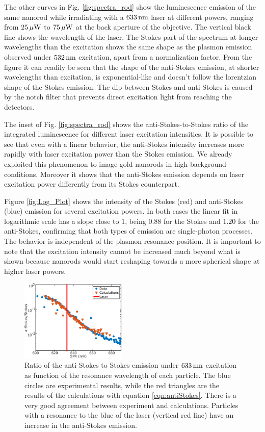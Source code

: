 The other curves in Fig. \ref{fig:spectra_rod} show the luminescence emission of
the same nanorod while irradiating with a $633\,\textrm{nm}$ laser at different powers,
ranging from $25\,\mu\textrm{W}$ to $75\,\mu\textrm{W}$ at the back aperture of the objective. The
vertical black line shows the wavelength of the laser. The Stokes part of the
spectrum at longer wavelengths than the excitation shows the same shape as the
plasmon emission observed under $532\,\textrm{nm}$ excitation, apart from a normalization
factor. From the figure it can readily be seen that the shape of the anti-Stokes
emission, at shorter wavelengths than excitation, is exponential-like and
doesn't follow the lorentzian shape of the Stokes emission. The dip between
Stokes and anti-Stokes is caused by the notch filter that prevents direct
excitation light from reaching the detectors.

The inset of Fig. \ref{fig:spectra_rod} shows the anti-Stokes-to-Stokes ratio of
the integrated luminescence for different laser excitation intensities. It is
possible to see that even with a linear behavior, the anti-Stokes intensity
increases more rapidly with laser excitation power than the Stokes emission.
We already exploited this phenomenon to image gold nanorods in high-background
conditions\cite{Carattino2016a}. Moreover it shows that the anti-Stokes emission
depends on laser excitation power differently from its Stokes counterpart. 

Figure \ref{fig:Log_Plot} shows the intensity of the Stokes (red) and
anti-Stokes (blue) emission for several excitation powers. In both cases the
linear fit in logarithmic scale has a slope close to $1$, being $0.88$ for the
Stokes and $1.20$ for the anti-Stokes, confirming that both types of emission
are single-photon processes. The behavior is independent of the plasmon
resonance position. It is important to note that the excitation intensity cannot
be increased much beyond what is shown because nanorods would start reshaping
towards a more spherical shape at higher laser powers.

\begin{figure}[htp] \centering
\includegraphics[width=0.45\textwidth]{Chapters/04_Anti-Stokes/Figures/Supplementary/02_AS_vs_S_SPR/02_AS_vs_S_SPR.png}
\caption{Ratio of the anti-Stokes to Stokes emission under $633\,\textrm{nm}$
excitation as function of the resonance wavelength of each particle.
The blue circles are experimental results, while the red triangles are
the results of the calculations with equation \ref{eqn:antiStokes}. There is a
very good agreement between experiment and calculations. Particles with a
resonance to the blue of the laser (vertical red line) have an increase in the
anti-Stokes emission.}
	\label{fig:ASS-ratio}
\end{figure}

